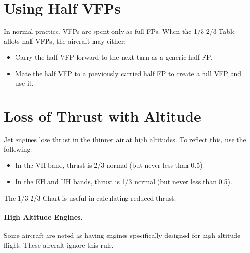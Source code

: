 \begin{advancedrules}

\section{Using Half VFPs}


In normal practice, VFPs are spent only as full FPs. When the 1/3-2/3 Table allots half VFPs, the aircraft may either:

\begin{itemize}

    \item Carry the half VFP forward to the next turn as a generic half FP.	

    \item Mate the half VFP to a previously carried half FP to create a full VFP  and use it.


\end{itemize}

\section{Loss of Thrust with Altitude}

Jet engines lose thrust in the thinner air at high altitudes. To reflect this, use the following:

\begin{itemize}

    \item In the VH band, thrust is 2/3 normal (but never less than 0.5).

    \item In the EH and UH bands, thrust is 1/3 normal (but never less than 0.5).

\end{itemize}

The 1/3-2/3 Chart is useful in calculating reduced thrust.

\paragraph{High Altitude Engines.} Some aircraft are noted as having engines specifically designed for high altitude flight. These aircraft ignore this rule.


\end{advancedrules}
